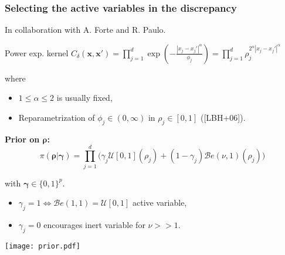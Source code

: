 \documentclass[nopagenumber,9pt]{beamer}
\newcommand{\bx}{\mathbf{x}}
\newcommand{\brho}{\boldsymbol{\rho}}
\newcommand{\bgamma}{\boldsymbol{\gamma}}
\newcommand{\citemano}[1]{\textcolor{dgreen}{#1}}
\begin{document}
\begin{frame}
 \frametitle{Selecting the active variables in the discrepancy}
In collaboration with A. Forte and R. Paulo.
 \bigskip
 
Power exp. kernel $C_{\delta}(\bx,\bx')= \prod_{j=1}^d \exp\left(-\frac{|x_j-x_j'|^\alpha}{\phi_j}\right) = \prod_{j=1}^d \rho_j^{2^\alpha |x_j-x_j'|^\alpha}$

 where 
 \begin{itemize}
  \item $1\leq\alpha\leq2$ is usually fixed,
  \item Reparametrization of $\phi_j\in(0,\infty)$ in  $\rho_j\in[0,1]$ (\citemano{[LBH+06]}). 
 \end{itemize}
 
 
 
   \begin{minipage}{.5\textwidth}

\medskip

\textbf{Prior on $\brho$:}
$$\pi(\brho|\bgamma)= \prod_{j=1}^d \Big(\gamma_j \mathcal{U}[0,1](\rho_j)  +(1-\gamma_j)\mathcal{B}e(\nu,1)(\rho_j)\Big) $$

with $\bgamma \in \{0,1\}^p$.%

\begin{itemize}

\item $\gamma_j=1\Leftrightarrow\mathcal{B}e(1,1)=\mathcal{U}[0,1]$ active variable,
 \item $\gamma_j=0$ encourages inert variable for $\nu>>1$.
\end{itemize}
 \end{minipage}
 \begin{minipage}{.45\textwidth}
 \centering
 \texttt{[image: prior.pdf]}
 \end{minipage}
 
\end{frame}
\end{document}
